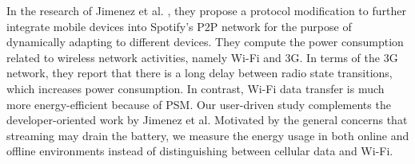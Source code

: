In the research of Jimenez et al. \cite{jimenez2013integrating}, they propose a protocol modification to further integrate mobile devices into Spotify’s P2P network for the purpose of dynamically adapting to different devices. They compute the power consumption related to wireless network activities, namely Wi-Fi and 3G. In terms of the 3G network, they report that there is a long delay between radio state transitions, which increases power consumption. In contrast, Wi-Fi data transfer is much more energy-efficient because of PSM. Our user-driven study complements the developer-oriented work by Jimenez et al. Motivated by the general concerns that streaming may drain the battery, we measure the energy usage in both online and offline environments instead of distinguishing between cellular data and Wi-Fi. 


